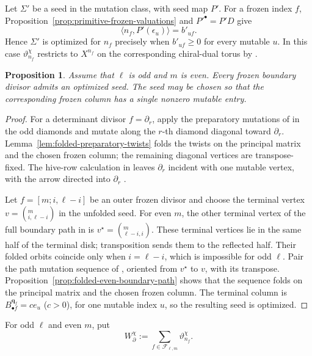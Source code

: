 \documentclass[11pt]{amsart}
\newtheorem{proposition}[theorem]{Proposition}
\theoremstyle{definition}
\theoremstyle{remark}
\begin{document}
Let $\Sigma'$ be a seed in the mutation class, with seed map $P'$.  For a
frozen index $f$, Proposition~\ref{prop:primitive-frozen-valuations} and
$P'^{\bullet}=P'D$ give
\[ \langle n_f,P'(\epsilon_u)\rangle=b'_{uf}. \]
Hence $\Sigma'$ is optimized for $n_f$ precisely when $b'_{uf}\ge0$ for
every mutable $u$.  In this case $\vartheta_{n_f}^{\chi}$ restricts to
$X^{n_f}$ on the corresponding chiral-dual torus by
\cite[Definition~9.1 and Lemma~9.3]{GHKK}.

\begin{proposition}\label{prop:optimized-boundary-seeds}
Assume that $\ell$ is odd and $m$ is even.  Every frozen boundary divisor
admits an optimized seed.  The seed may be chosen so that the corresponding
frozen column has a single nonzero mutable entry.
\end{proposition}

\begin{proof}
For a determinant divisor $f=\partial_r$, apply the preparatory mutations of
\cite{FeiKroneckerII} in the odd diamonds and mutate along the $r$-th
diamond diagonal toward $\partial_r$.  Lemma~\ref{lem:folded-preparatory-twists} folds the twists on
the principal matrix and the chosen frozen column; the remaining diagonal
vertices are transpose-fixed.  The hive-row calculation in \cite{FeiKroneckerII} leaves
$\partial_r$ incident with one mutable vertex, with the arrow directed into
$\partial_r$ \cite[Lemmas~6.12--6.13]{FeiKroneckerII}.

Let $f=[m;i,\ell-i]$ be an outer frozen divisor and choose the terminal
vertex $v=(_{i,\ell-i}^{m})$ in the unfolded seed.  For even $m$, the other
terminal vertex of the full boundary path in \cite{FeiKroneckerII} is
$v^{\star}=(_{\ell-i,i}^{m})$.
These terminal vertices lie in the same half of the terminal disk;
transposition sends them to the reflected half.  Their folded orbits coincide only when
$i=\ell-i$, which is impossible for odd $\ell$.  Pair the path mutation
sequence of \cite{FeiKroneckerII}, oriented from $v^{\star}$ to $v$, with its transpose.
Proposition~\ref{prop:folded-even-boundary-path} shows that the sequence folds
on the principal matrix and the chosen frozen column.  The terminal column
is
$B^{\mathbf q_f}_{\bullet f}=c e_u$ ($c>0$),
for one mutable index $u$, so the resulting seed is optimized.
\end{proof}

For odd $\ell$ and even $m$, put
\[ W_{\partial}^{\chi} :=\sum_{f\in\mathscr F_{\ell,m}}\vartheta_{n_f}^{\chi}. \]
\end{document}

